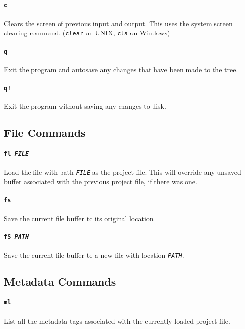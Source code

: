 \documentclass[a4paper]{article}
\begin{document}
\paragraph{\texttt{c}}
Clears the screen of previous input and output. This uses the system screen 
clearing command. (\texttt{clear} on UNIX, \texttt{cls} on Windows)

\paragraph{\texttt{q}}
Exit the program and autosave any changes that have been made to the tree.

\paragraph{\texttt{q!}}
Exit the program without saving any changes to disk.

\subsection{File Commands}

\paragraph{\texttt{fl \textit{FILE}}}
Load the file with path \texttt{\textit{FILE}} as the project file. This will 
override any unsaved buffer associated with the previous project file, if there 
was one.

\paragraph{\texttt{fs}}
Save the current file buffer to its original location.

\paragraph{\texttt{fS \textit{PATH}}}
Save the current file buffer to a new file with location \texttt{\textit{PATH}}.

\subsection{Metadata Commands}

\paragraph{\texttt{ml}}
List all the metadata tags associated with the currently loaded project
file.
\end{document}
